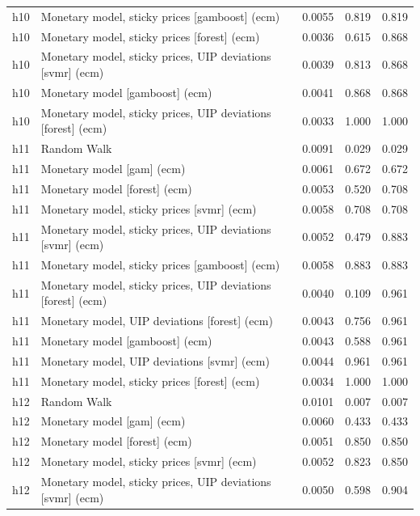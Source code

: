 \begin{ThreePartTable}
\begin{longtable}[t]{cp{5.5cm}ccc}
h10 & \raggedright Monetary model, sticky prices [gamboost] (ecm) & 0.0055 & 0.819 & 0.819\\
h10 & \raggedright Monetary model, sticky prices [forest] (ecm) & 0.0036 & 0.615 & 0.868\\
h10 & \raggedright Monetary model, sticky prices, UIP deviations [svmr] (ecm) & 0.0039 & 0.813 & 0.868\\
h10 & \raggedright Monetary model [gamboost] (ecm) & 0.0041 & 0.868 & 0.868\\
h10 & \raggedright Monetary model, sticky prices, UIP deviations [forest] (ecm) & 0.0033 & 1.000 & 1.000\\
\addlinespace
h11 & \raggedright Random Walk & 0.0091 & 0.029 & 0.029\\
h11 & \raggedright Monetary model [gam] (ecm) & 0.0061 & 0.672 & 0.672\\
h11 & \raggedright Monetary model [forest] (ecm) & 0.0053 & 0.520 & 0.708\\
h11 & \raggedright Monetary model, sticky prices [svmr] (ecm) & 0.0058 & 0.708 & 0.708\\
h11 & \raggedright Monetary model, sticky prices, UIP deviations [svmr] (ecm) & 0.0052 & 0.479 & 0.883\\
h11 & \raggedright Monetary model, sticky prices [gamboost] (ecm) & 0.0058 & 0.883 & 0.883\\
h11 & \raggedright Monetary model, sticky prices, UIP deviations [forest] (ecm) & 0.0040 & 0.109 & 0.961\\
h11 & \raggedright Monetary model, UIP deviations [forest] (ecm) & 0.0043 & 0.756 & 0.961\\
h11 & \raggedright Monetary model [gamboost] (ecm) & 0.0043 & 0.588 & 0.961\\
h11 & \raggedright Monetary model, UIP deviations [svmr] (ecm) & 0.0044 & 0.961 & 0.961\\
h11 & \raggedright Monetary model, sticky prices [forest] (ecm) & 0.0034 & 1.000 & 1.000\\
\addlinespace
h12 & \raggedright Random Walk & 0.0101 & 0.007 & 0.007\\
h12 & \raggedright Monetary model [gam] (ecm) & 0.0060 & 0.433 & 0.433\\
h12 & \raggedright Monetary model [forest] (ecm) & 0.0051 & 0.850 & 0.850\\
h12 & \raggedright Monetary model, sticky prices [svmr] (ecm) & 0.0052 & 0.823 & 0.850\\
h12 & \raggedright Monetary model, sticky prices, UIP deviations [svmr] (ecm) & 0.0050 & 0.598 & 0.904\\

\end{longtable}
\end{ThreePartTable}
